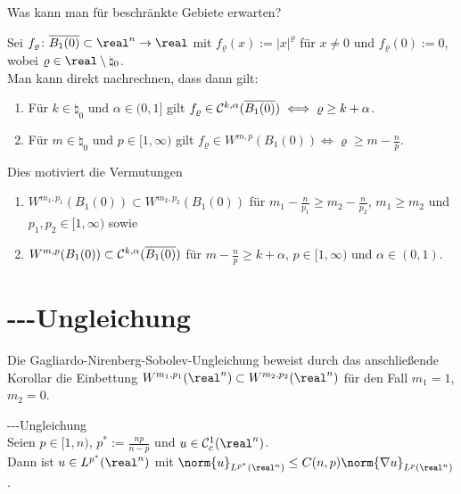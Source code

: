 \begin{Bem}
    Was kann man für beschränkte Gebiete erwarten?

    Sei $f_\varrho\colon \overline{B_1(0)} \subset \real^n \to \real$ mit
    $f_\varrho(x) := |x|^\varrho$ für $x \not= 0$ und $f_\varrho(0) := 0$,
    wobei $\varrho \in \real \setminus \natural_0$.\\
    Man kann direkt nachrechnen, dass dann gilt:
    \begin{enumerate}
        \item
        Für $k \in \natural_0$ und $\alpha \in (0, 1]$ gilt
        $f_\varrho \in \mathcal{C}^{k,\alpha}(\overline{B_1(0)}) \iff \varrho \ge k + \alpha$.

        \item
        Für $m \in \natural_0$ und $p \in [1, \infty)$ gilt
        $f_\varrho \in W^{m,p}(B_1(0)) \iff \varrho \ge m - \frac{n}{p}$.
    \end{enumerate}
    Dies motiviert die Vermutungen
    \begin{enumerate}
        \item
        $W^{m_1,p_1}(B_1(0)) \subset W^{m_2,p_2}(B_1(0))$ für
        $m_1 - \frac{n}{p_1} \ge m_2 - \frac{n}{p_2}$, $m_1 \ge m_2$ und
        $p_1, p_2 \in [1, \infty)$ sowie

        \item
        $W^{m,p}(B_1(0)) \subset \mathcal{C}^{k,\alpha}(\overline{B_1(0)})$ für
        $m - \frac{n}{p} \ge k + \alpha$, $p \in [1, \infty)$ und $\alpha \in (0, 1)$.
    \end{enumerate}
\end{Bem}

\pagebreak

\section{%
    ---Ungleichung%
}

\begin{Bem}
    Die Gagliardo-Nirenberg-Sobolev-Ungleichung beweist durch das anschließende Korollar
    die Einbettung $W^{m_1,p_1}(\real^n) \subset W^{m_2,p_2}(\real^n)$ für den Fall
    $m_1 = 1$, $m_2 = 0$.
\end{Bem}

\begin{Satz}{---Ungleichung}\\
    Seien $p \in [1, n)$, $p^\ast := \frac{np}{n - p}$ und $u \in \C^1_c(\real^n)$.\\
    Dann ist $u \in L^{p^\ast}(\real^n)$ mit
    $\norm{u}_{L^{p^\ast}(\real^n)} \le C(n,p) \norm{\nabla u}_{L^p(\real^n)}$.
\end{Satz}


